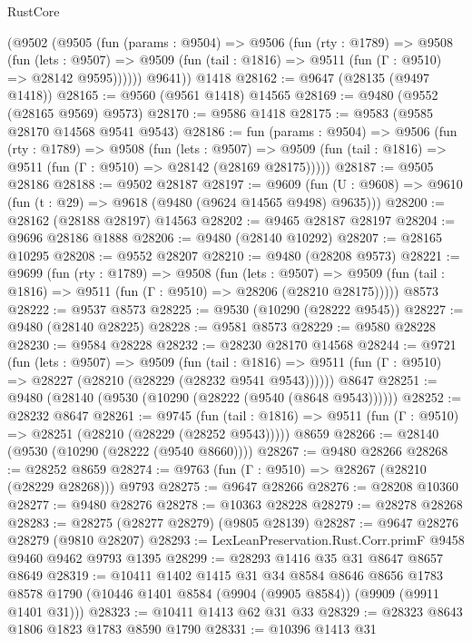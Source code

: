 \begin{lexlean}{RustCore}
\begin{coremodule}
      (@9502
        (@9505
          (fun (params : @9504) =>
          @9506
            (fun (rty : @1789) =>
            @9508
              (fun (lets : @9507) =>
              @9509 (fun (tail : @1816) => @9511 (fun (Γ : @9510) => @28142 @9595))))))
        @9641))
    @1418
@28162 := @9647 (@28135 (@9497 @1418))
@28165 := @9560 (@9561 @1418) @14565
@28169 := @9480 (@9552 (@28165 @9569) @9573)
@28170 := @9586 @1418
@28175 := @9583 (@9585 @28170 @14568 @9541 @9543)
@28186 := fun (params : @9504) =>
  @9506
    (fun (rty : @1789) =>
    @9508
      (fun (lets : @9507) =>
      @9509 (fun (tail : @1816) => @9511 (fun (Γ : @9510) => @28142 (@28169 @28175)))))
@28187 := @9505 @28186
@28188 := @9502 @28187
@28197 := @9609
    (fun (U : @9608) => @9610 (fun (t : @29) => @9618 (@9480 (@9624 @14565 @9498) @9635)))
@28200 := @28162 (@28188 @28197) @14563
@28202 := @9465 @28187 @28197
@28204 := @9696 @28186 @1888
@28206 := @9480 (@28140 @10292)
@28207 := @28165 @10295
@28208 := @9552 @28207
@28210 := @9480 (@28208 @9573)
@28221 := @9699
    (fun (rty : @1789) =>
    @9508
      (fun (lets : @9507) =>
      @9509 (fun (tail : @1816) => @9511 (fun (Γ : @9510) => @28206 (@28210 @28175)))))
    @8573
@28222 := @9537 @8573
@28225 := @9530 (@10290 (@28222 @9545))
@28227 := @9480 (@28140 @28225)
@28228 := @9581 @8573
@28229 := @9580 @28228
@28230 := @9584 @28228
@28232 := @28230 @28170 @14568
@28244 := @9721
    (fun (lets : @9507) =>
    @9509
      (fun (tail : @1816) =>
      @9511 (fun (Γ : @9510) => @28227 (@28210 (@28229 (@28232 @9541 @9543))))))
    @8647
@28251 := @9480 (@28140 (@9530 (@10290 (@28222 (@9540 (@8648 @9543))))))
@28252 := @28232 @8647
@28261 := @9745
    (fun (tail : @1816) => @9511 (fun (Γ : @9510) => @28251 (@28210 (@28229 (@28252 @9543)))))
    @8659
@28266 := @28140 (@9530 (@10290 (@28222 (@9540 @8660))))
@28267 := @9480 @28266
@28268 := @28252 @8659
@28274 := @9763 (fun (Γ : @9510) => @28267 (@28210 (@28229 @28268))) @9793
@28275 := @9647 @28266
@28276 := @28208 @10360
@28277 := @9480 @28276
@28278 := @10363 @28228
@28279 := @28278 @28268
@28283 := @28275 (@28277 @28279) (@9805 @28139)
@28287 := @9647 @28276 @28279 (@9810 @28207)
@28293 := LexLeanPreservation.Rust.Corr.primF @9458 @9460 @9462 @9793 @1395
@28299 := @28293 @1416 @35 @31 @8647 @8657 @8649
@28319 := @10411
    @1402
    @1415
    @31
    @34
    @8584
    @8646
    @8656
    @1783
    @8578
    @1790
    (@10446 @1401 @8584 (@9904 (@9905 @8584)) (@9909 (@9911 @1401 @31)))
@28323 := @10411 @1413 @62 @31 @33
@28329 := @28323 @8643 @1806 @1823 @1783 @8590 @1790
@28331 := @10396 @1413 @31

\end{coremodule}
\end{lexlean}
